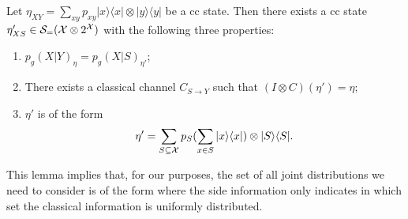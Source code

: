 \begin{lemma}
    \label{lem:ccsimp}
    Let $\eta_{XY}=\sum_{xy}p_{xy}|x\rangle\langle x|\otimes |y\rangle\langle y|$ be a cc state. Then there exists a cc state $\eta'_{XS}\in \mathcal{S}_=(\mathcal{X}\otimes 2^{\mathcal{X}})$ with the following three properties:
    \begin{enumerate}
        \item $p_g(X|Y)_\eta = p_g(X|S)_{\eta'}$;
        \item There exists a classical channel $C_{S\rightarrow Y}$ such that $(I\otimes C)(\eta')=\eta$;
        \item $\eta'$ is of the form
            $$\eta'=\sum_{S\subseteq \mathcal{X}}p_{S}(\sum_{x\in S}|x\rangle\langle x|)\otimes |S\rangle\langle S|.$$
    \end{enumerate}
\end{lemma}
This lemma implies that, for our purposes, the set of all joint distributions we need to consider is of the form where the side information only indicates in which set the classical information is uniformly distributed.
